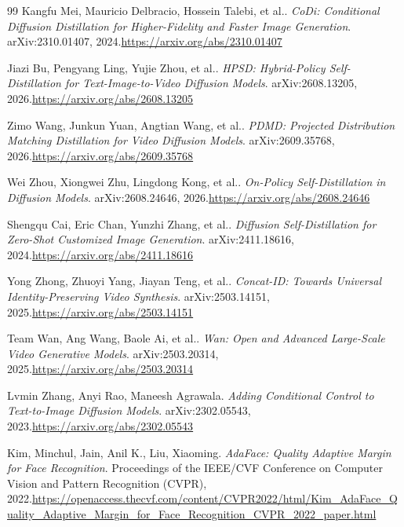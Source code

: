\documentclass[11pt]{article}
\begin{document}
\begin{thebibliography}{99}
Kangfu Mei, Mauricio Delbracio, Hossein Talebi, et al.. \emph{CoDi: Conditional Diffusion Distillation for Higher-Fidelity and Faster Image Generation}. arXiv:2310.01407, 2024.\newline\url{https://arxiv.org/abs/2310.01407}

Jiazi Bu, Pengyang Ling, Yujie Zhou, et al.. \emph{HPSD: Hybrid-Policy Self-Distillation for Text-Image-to-Video Diffusion Models}. arXiv:2608.13205, 2026.\newline\url{https://arxiv.org/abs/2608.13205}

Zimo Wang, Junkun Yuan, Angtian Wang, et al.. \emph{PDMD: Projected Distribution Matching Distillation for Video Diffusion Models}. arXiv:2609.35768, 2026.\newline\url{https://arxiv.org/abs/2609.35768}

Wei Zhou, Xiongwei Zhu, Lingdong Kong, et al.. \emph{On-Policy Self-Distillation in Diffusion Models}. arXiv:2608.24646, 2026.\newline\url{https://arxiv.org/abs/2608.24646}

Shengqu Cai, Eric Chan, Yunzhi Zhang, et al.. \emph{Diffusion Self-Distillation for Zero-Shot Customized Image Generation}. arXiv:2411.18616, 2024.\newline\url{https://arxiv.org/abs/2411.18616}

Yong Zhong, Zhuoyi Yang, Jiayan Teng, et al.. \emph{Concat-ID: Towards Universal Identity-Preserving Video Synthesis}. arXiv:2503.14151, 2025.\newline\url{https://arxiv.org/abs/2503.14151}

Team Wan, Ang Wang, Baole Ai, et al.. \emph{Wan: Open and Advanced Large-Scale Video Generative Models}. arXiv:2503.20314, 2025.\newline\url{https://arxiv.org/abs/2503.20314}

Lvmin Zhang, Anyi Rao, Maneesh Agrawala. \emph{Adding Conditional Control to Text-to-Image Diffusion Models}. arXiv:2302.05543, 2023.\newline\url{https://arxiv.org/abs/2302.05543}

Kim, Minchul, Jain, Anil K., Liu, Xiaoming. \emph{AdaFace: Quality Adaptive Margin for Face Recognition}. Proceedings of the IEEE/CVF Conference on Computer Vision and Pattern Recognition (CVPR), 2022.\newline\url{https://openaccess.thecvf.com/content/CVPR2022/html/Kim_AdaFace_Quality_Adaptive_Margin_for_Face_Recognition_CVPR_2022_paper.html}


\end{thebibliography}
\end{document}
